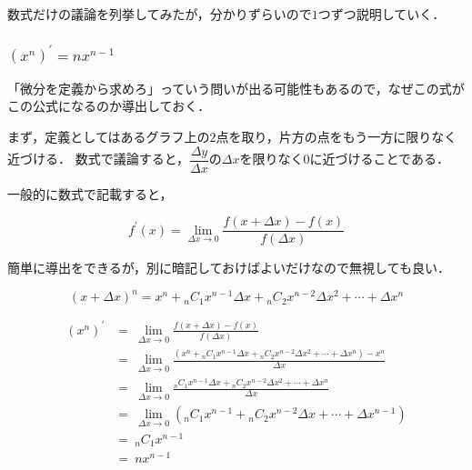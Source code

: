 \documentclass[a4paper,11pt]{ltjsarticle}
\begin{document}
数式だけの議論を列挙してみたが，分かりずらいので$1$つずつ説明していく．

\clearpage

\subsubsection{$(x^{n})^{\prime}=nx^{n-1}$}


「微分を定義から求めろ」っていう問いが出る可能性もあるので，なぜこの式がこの公式になるのか導出しておく．

まず，定義としてはあるグラフ上の$2$点を取り，片方の点をもう一方に限りなく近づける．
数式で議論すると，$\dfrac{\Delta y}{\Delta x}$の$\Delta x$を限りなく$0$に近づけることである．


一般的に数式で記載すると，

\begin{equation*}
  f^{\prime}(x)=\displaystyle{\lim_{\Delta x \to 0} \frac{f(x+\Delta x)-f(x)}{f(\Delta x)}}
\end{equation*}

簡単に導出をできるが，別に暗記しておけばよいだけなので無視しても良い．

\begin{equation*}
  (x+\Delta x)^{n} = x^n + {}_nC_1 x^{n − 1}\Delta x + {}_nC_2 x^{n − 2}\Delta x^2 + \cdots + \Delta x^n
\end{equation*}

\begin{equation*}
  \begin{aligned}
    (x^{n})^{\prime} &=\ \displaystyle{\lim_{\Delta x \to 0} \frac{f(x+\Delta x)-f(x)}{f(\Delta x)}} \\
                     &=\ \displaystyle{\lim_{\Delta x \to 0} \frac{(x^n + {}_nC_1 x^{n−1}\Delta x + {}_nC_2 x^{n−2}\Delta x^2 + \cdots + \Delta x^n) − x^n}{\Delta x}} \\
                     &=\ \displaystyle{\lim_{\Delta x \to 0} \frac{{}_nC_1 x^{n−1}\Delta x + {}_nC_2x^{n−2}\Delta x^2 + \cdots + \Delta x^n}{\Delta x}} \\
                     &=\ \displaystyle{\lim_{\Delta x \to 0} ({}_nC_1x^{n−1} + {}_nC_2 x^{n−2}\Delta x + \cdots + \Delta x^{n−1})} \\
                     &=\ \displaystyle{{}_nC_1 x^{n−1}} \\
                     &=\ \displaystyle{nx^{n−1}}
  \end{aligned}
\end{equation*}
\end{document}
